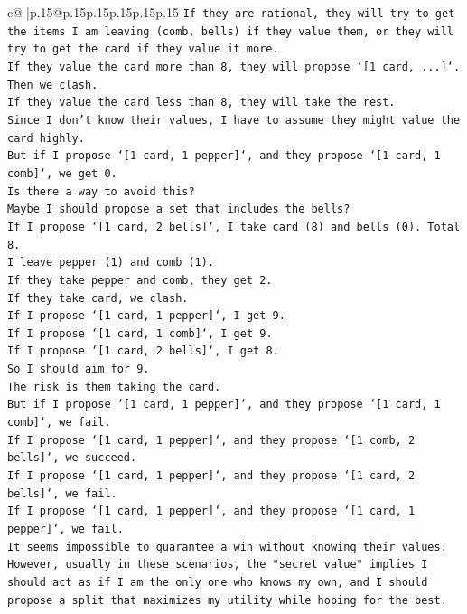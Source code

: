 \documentclass{article}
\begin{document}
{\begin{supertabular}{c@{$\;$}|p{.15\linewidth}@{}p{.15\linewidth}p{.15\linewidth}p{.15\linewidth}p{.15\linewidth}p{.15\linewidth}}
{{{\texttt{If they are rational, they will try to get the items I am leaving (comb, bells) if they value them, or they will try to get the card if they value it more.} \\
\texttt{If they value the card more than 8, they will propose `{[}1 card, ...{]}`. Then we clash.} \\
\texttt{If they value the card less than 8, they will take the rest.} \\
\texttt{Since I don't know their values, I have to assume they might value the card highly.} \\
\texttt{But if I propose `{[}1 card, 1 pepper{]}`, and they propose `{[}1 card, 1 comb{]}`, we get 0.} \\
\texttt{Is there a way to avoid this?} \\
\texttt{Maybe I should propose a set that includes the bells?} \\
\texttt{If I propose `{[}1 card, 2 bells{]}`, I take card (8) and bells (0). Total 8.} \\
\texttt{I leave pepper (1) and comb (1).} \\
\texttt{If they take pepper and comb, they get 2.} \\
\texttt{If they take card, we clash.} \\
\texttt{If I propose `{[}1 card, 1 pepper{]}`, I get 9.} \\
\texttt{If I propose `{[}1 card, 1 comb{]}`, I get 9.} \\
\texttt{If I propose `{[}1 card, 2 bells{]}`, I get 8.} \\
\texttt{So I should aim for 9.} \\
\texttt{The risk is them taking the card.} \\
\texttt{But if I propose `{[}1 card, 1 pepper{]}`, and they propose `{[}1 card, 1 comb{]}`, we fail.} \\
\texttt{If I propose `{[}1 card, 1 pepper{]}`, and they propose `{[}1 comb, 2 bells{]}`, we succeed.} \\
\texttt{If I propose `{[}1 card, 1 pepper{]}`, and they propose `{[}1 card, 2 bells{]}`, we fail.} \\
\texttt{If I propose `{[}1 card, 1 pepper{]}`, and they propose `{[}1 card, 1 pepper{]}`, we fail.} \\
\texttt{It seems impossible to guarantee a win without knowing their values.} \\
\texttt{However, usually in these scenarios, the "secret value" implies I should act as if I am the only one who knows my own, and I should propose a split that maximizes my utility while hoping for the best.} \\
}}}
\end{supertabular}}
\end{document}
